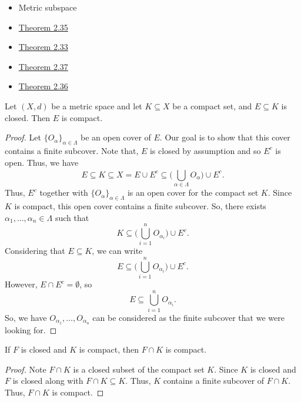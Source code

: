 \documentclass[a4paper]{report}
\begin{document}
\begin{itemize}
    \item Metric subspace
    \item {\hyperref[Theorem 2.35]{Theorem 2.35}} 
    \item {\hyperref[Theorem 2.33]{Theorem 2.33}} 
    \item {\hyperref[Theorem 2.37]{Theorem 2.37}} 
    \item {\hyperref[Theorem 2.36]{Theorem 2.36}} 
\end{itemize}

\begin{theorem}[ ]\label{Theorem 2.35}
    Let \( (X,d) \) be a metric space and let \( K \subseteq  X  \) be a compact set, and \( E \subseteq  K  \) is closed. Then \( E  \) is compact.
\end{theorem}
\begin{proof}
    Let \( \{ {O}_{\alpha} \}_{\alpha \in \Lambda} \) be an open cover of \( E  \). Our goal is to show that this cover contains a finite subcover. Note that, \( E  \) is closed by assumption and so \( E^{c} \) is open. Thus, we have \[ E \subseteq  K  \subseteq  X  = E  \cup E^{c} \subseteq  \Big(  \bigcup_{ \alpha \in \Lambda }^{  }  {O}_{\alpha} \Big) \cup E^{c}.  \]
    Thus, \( E^{c}  \) together with \( \{ {O}_{\alpha} \}_{\alpha \in \Lambda} \) is an open cover for the compact set \( K  \). Since \(  K  \) is compact, this open cover contains a finite subcover. So, there exists \( {\alpha}_{1}, \dots, {\alpha}_{n} \in \Lambda \) such that 
    \[  K \subseteq  \Big( \bigcup_{ i = 1  }^{ n }  {O}_{{\alpha}_{i}} \Big) \cup E^{c}. \]
    Considering that \( E \subseteq K \), we can write 
    \[  E \subseteq  \Big( \bigcup_{ i = 1  }^{ n }  {O}_{{\alpha}_{i}} \Big) \cup E^{c}. \]
    However, \(E \cap E^{c} = \emptyset \), so
    \[  E \subseteq \bigcup_{ i = 1  }^{ n   }  {O}_{{\alpha}_{i}}. \]
    So, we have \( {O}_{{\alpha}_{1}}, \dots, {O}_{{\alpha}_{n}} \) can be considered as the finite subcover that we were looking for.
\end{proof}

\begin{corollary}
    If \( F  \) is closed and \( K  \) is compact, then \( F \cap K  \) is compact.
\end{corollary}
\begin{proof}
Note \( F \cap K  \) is a closed subset of the compact set \(  K  \). Since \( K   \) is closed and \( F  \) is closed along with \( F \cap K \subseteq  K   \). Thus, \( K  \) contains a finite subcover of \( F \cap K  \). Thus, \( F \cap K  \) is compact.
\end{proof}
\end{document}
